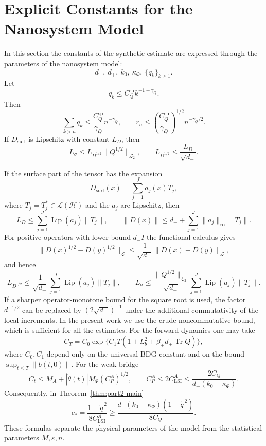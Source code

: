 \documentclass{article}
\newcommand{\LLtwo}{\mathcal L_2}
\newcommand{\Tr}{\operatorname{Tr}}
\begin{document}
\section{Explicit Constants for the Nanosystem Model}
\label{sec:explicit-constants}

In this section the constants of the synthetic estimate are expressed through the
parameters of the nanosystem model:
\[
        d_-,\ d_+,\ k_0,\ \kappa_\Phi,\ \{q_k\}_{k\ge1}.
\]
Let
\[
        q_k\le C_Q^{\mathrm{sp}}k^{-1-\gamma_Q}.
\]
Then
\[
        \sum_{k>n}q_k\le \frac{C_Q^{\mathrm{sp}}}{\gamma_Q}n^{-\gamma_Q},
        \qquad
        r_n\le
        \left(\frac{C_Q^{\mathrm{sp}}}{\gamma_Q}\right)^{1/2}
        n^{-\gamma_Q/2}.
\]
If \(D_{\mathrm{surf}}\) is Lipschitz with constant \(L_D\), then
\[
        L_\sigma
        \le
        L_{D^{1/2}}\|Q^{1/2}\|_{\LLtwo},
        \qquad
        L_{D^{1/2}}\le \frac{L_D}{\sqrt{d_-}}.
\]

If the surface part of the tensor has the expansion
\[
        D_{\mathrm{surf}}(x)=\sum_{j=1}^J a_j(x)T_j,
\]
where \(T_j=T_j^*\in\mathcal L(\mathcal H)\) and the \(a_j\) are Lipschitz, then
\[
        L_D\le \sum_{j=1}^J \operatorname{Lip}(a_j)\|T_j\|,\qquad
        \|D(x)\|\le d_+ + \sum_{j=1}^J \|a_j\|_\infty\|T_j\| .
\]
For positive operators with lower bound \(d_-I\) the functional calculus gives
\[
        \|D(x)^{1/2}-D(y)^{1/2}\|_{\mathcal L}\le \frac{1}{\sqrt{d_-}}\|D(x)-D(y)\|_{\mathcal L},
\]
and hence
\[
        L_{D^{1/2}}\le \frac{1}{\sqrt{d_-}}\sum_{j=1}^J \operatorname{Lip}(a_j)\|T_j\|,\qquad
        L_\sigma\le \frac{\|Q^{1/2}\|_{\mathcal L_2}}{\sqrt{d_-}}\sum_{j=1}^J \operatorname{Lip}(a_j)\|T_j\| .
\]
If a sharper operator-monotone bound for the square root is used, the factor
\(d_-^{-1/2}\) can be replaced by \((2\sqrt{d_-})^{-1}\) under the additional
commutativity of the local increments. In the present work we use the crude
noncommutative bound, which is sufficient for all the estimates.
For the forward dynamics one may take
\[
        C_T
        =
        C_0\exp\{C_1T(1+L_b^2+\beta_+d_+\Tr Q)\},
\]
where \(C_0,C_1\) depend only on the universal BDG constant and on the bound
\(\sup_{t\le T}\|b(t,0)\|\). For the weak bridge
\[
        C_t
        \le
        M_A+|\dot\theta(t)|M_\Psi(C_P^A)^{1/2},
        \qquad
        C_P^A\le 2C_{\mathrm{LSI}}^A
        \le
        \frac{2C_Q}{d_-(k_0-\kappa_\Phi)}.
\]
Consequently, in Theorem~\ref{thm:part2-main}
\[
        c_*=
        \frac{1-\widetilde q^{\,2}}{8C_{\mathrm{LSI}}^A}
        \ge
        \frac{d_-(k_0-\kappa_\Phi)(1-\widetilde q^{\,2})}{8C_Q}.
\]
These formulas separate the physical parameters of the model from the statistical
parameters \(M,\varepsilon,n\).
\end{document}
